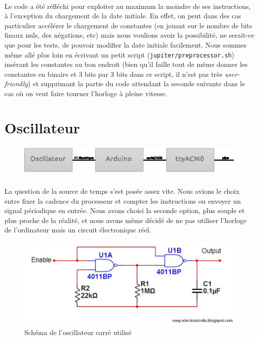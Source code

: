 \documentclass{article}
\begin{document}
\paragraph{}Le code a été réfléchi pour exploiter au maximum la moindre de ses instructions, à l'exception du chargement de la date initiale. En effet, on peut dans des cas particulier accélérer le chargement de constantes (en jouant sur le nombre de bits finaux nuls, des négations, etc) mais nous voulions avoir la possibilité, ne serait-ce que pour les tests, de pouvoir modifier la date initiale facilement. Nous sommes même allé plus loin en écrivant un petit script (\texttt{jupiter/preprocessor.sh}) insérant les constantes au bon endroit (bien qu'il faille tout de même donner les constantes en binaire et 3 bits par 3 bits dans ce script, il n'est pas très \emph{user-friendly}) et supprimant la partie du code attendant la seconde suivante dans le cas où on veut faire tourner l'horloge à pleine vitesse.





\section{Oscillateur}

\begin{figure}[h]
\centering
\includegraphics[height=4em]{zoom_input.eps}
\end{figure}

\paragraph{}La question de la source de temps s'est posée assez vite. Nous avions le choix entre fixer la cadence du processeur et compter les instructions ou envoyer un signal périodique en entrée. Nous avons choisi la seconde option, plus souple et plus proche de la réalité, et nous avons même décidé de ne pas utiliser l'horloge de l'ordinateur mais un circuit électronique réel.


\begin{figure}[h]
\centering
\includegraphics{oscillator.jpg.eps}
\caption{\label{schema} Schéma de l'oscillateur carré utilisé}
\end{figure}
\end{document}
